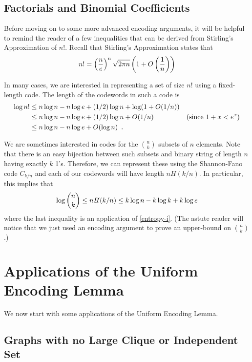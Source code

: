 \documentclass{patmorin}
\begin{document}
\subsection{Factorials and Binomial Coefficients}

Before moving on to some more advanced encoding arguments, it will
be helpful to remind the reader of a few inequalities that can be
derived from Stirling's Approximation of $n!$.  Recall that Stirling's
Approximation states that
\begin{equation}
  n! = \left(\frac{n}{e}\right)^n\sqrt{2\pi n}\left(1+O\left(\frac{1}{n}\right)\right) 
   \eqlabel{stirling}
\end{equation}

In many cases, we are interested in representing a set of size $n!$
using a fixed-length code.  The length of the codewords in such a code is
\begin{align}
  \log n!
      & \le n\log n - n\log e + (1/2)\log n + \log(1+O(1/n)) \notag \\
      & \le n\log n - n\log e + (1/2)\log n + O(1/n)  
             & \text{(since $1+x < e^x$)} \notag \\
      & \le n\log n - n\log e + O(\log n)  
             \eqlabel{stirling-loose} \enspace .
\end{align}

We are sometimes interested in codes for the $\binom{n}{k}$ subsets of
$n$ elements.  Note that there is an easy bijection between such subsets
and binary string of length $n$ having exactly $k$ 1's. Therefore, we
can represent these using the Shannon-Fano code $C_{k/n}$ and each of our
codewords will have length $nH(k/n)$.  In particular, this implies that
\begin{equation}
  \log\binom{n}{k} \le nH(k/n) \le k\log n - k\log k + k\log e 
  \eqlabel{log-n-choose-k}
\end{equation}
where the last inequality is an application of \eqref{entropy-i}. (The
astute reader will notice that we just used an encoding argument to
prove an upper-bound on $\binom{n}{k}$.)

\section{Applications of the Uniform Encoding Lemma}

We now start with some applications of the Uniform Encoding Lemma.

\subsection{Graphs with no Large Clique or Independent Set}
\end{document}
